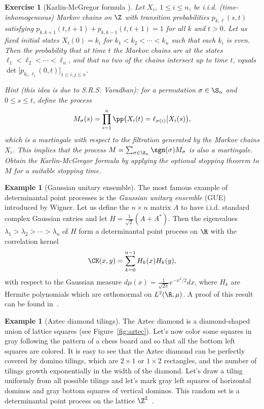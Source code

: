 \documentclass[]{pcmi}
\theoremstyle{plain}
\newtheorem{exercise}[equation]{Exercise}
\theoremstyle{definition}
\newtheorem{example}[equation]{Example}
\begin{document}
\begin{exercise}[Karlin-McGregor formula \cite{karlinMcGregor}]\label{ex:KMcG}
Let $X_i$, $1 \leq i \leq n$, be i.i.d. (time-inhomogeneous) Markov chains on $\Z$ with transition probabilities $p_{k, \ell}(s,t)$ satisfying $p_{k, k+1}(t, t+1) + p_{k, k-1}(t, t+1) = 1$ for all $k$ and $t > 0$. Let us fixed initial states $X_i(0) = k_i$ for $k_1 < k_2 < \cdots < k_n$ such that each $k_i$ is even. Then the probability that at time $t$ the Markov chains are at the states $\ell_1 < \ell_2 < \cdots < \ell_n$, and that no two of the chains intersect up to time $t$, equals $\det \bigl[p_{k_i,\ell_j}(0, t)\bigr]_{1 \leq i, j \leq n}$. 

Hint (this idea is due to S.R.S. Varadhan): for a permutation $\sigma \in \S_n$ and $0 \leq s \leq t$, define the process
\begin{equation}
 M_\sigma(s) = \prod_{i=1}^n \pp\bigl( X_{i}(t) = \ell_{\sigma(i)} \big| X_i(s)\bigr),
\end{equation}
which is a martingale with respect to the filtration generated by the Markov chains $X_i$. This implies that the process $M = \sum_{\sigma \in \S_n} \sgn(\sigma) M_\sigma$ is also a martingale. Obtain the Karlin-McGregor formula by applying the optional stopping theorem to $M$ for a suitable stopping time.
\end{exercise}

\begin{example}[Gaussian unitary ensemble]
The most famous example of determinantal point processes is the \emph{Gaussian unitary ensemble} (GUE) introduced by Wigner. Let us define the $n\times n$ matrix $A$ to have i.i.d. standard complex Gaussian entries and let $H = \frac{1}{\sqrt 2} (A + A^*)$. Then the eigenvalues $\lambda_1 > \lambda_2 > \cdots > \lambda_n$ of $H$ form a determinantal point process on $\R$ with the correlation kernel
\[
 \CK(x,y) = \sum_{k = 0}^{n-1} H_k(x) H_k(y),
\]
with respect to the Gaussian measure $d \mu(x) = \frac{1}{\sqrt{2 \pi}} e^{-x^2 / 2} dx$, where $H_k$ are Hermite polynomials which are orthonormal on $L^2(\R, \mu)$. A proof of this result can be found in~\cite[Ch. 3]{mehta}.
\end{example}

\begin{example}[Aztec diamond tilings]
The Aztec diamond is a diamond-shaped union of lattice squares (see Figure~\ref{fig:aztec}). Let's now color some squares in gray following the pattern of a chess board and so that all the bottom left squares are colored. It is easy to see that the Aztec diamond can be perfectly covered by domino tilings, which are $2 \times 1$ or $1 \times 2$ rectangles, and the number of tilings growth exponentially in the width of the diamond. Let's draw a tiling uniformly from all possible tilings and let's mark gray left squares of horizontal dominos and gray bottom squares of vertical dominos. This random set is a determinantal point process on the lattice $\Z^2$~\cite{MR2118857}.
\end{example}
\end{document}
